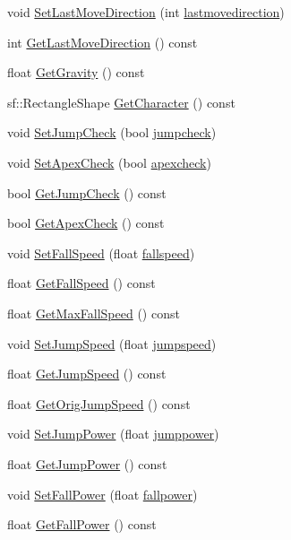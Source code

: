 \begin{DoxyCompactItemize}
\item 
void \hyperlink{classPrincessObject_a7eccf4c5d354c1b48bf19eb3f6c2ef42}{Set\+Last\+Move\+Direction} (int \hyperlink{classPrincessObject_a5a645f3d8269497c59944775e6758e7f}{lastmovedirection})
\item 
int \hyperlink{classPrincessObject_a442d231ddd5d083b1571d276f24318fc}{Get\+Last\+Move\+Direction} () const 
\item 
float \hyperlink{classPrincessObject_a341bb1d246698092d1dd2138dc0a0a9e}{Get\+Gravity} () const 
\item 
sf\+::\+Rectangle\+Shape \hyperlink{classPrincessObject_afd8eaba45b96e8deafd7f2730e2bbb72}{Get\+Character} () const 
\item 
void \hyperlink{classPrincessObject_ac563d582ecc3fdf646c9e0c2af1936fb}{Set\+Jump\+Check} (bool \hyperlink{classPrincessObject_a70b6fd942174a1bb7315cd2d1ff0f214}{jumpcheck})
\item 
void \hyperlink{classPrincessObject_a269f54cc9474075c1af91546f00f7779}{Set\+Apex\+Check} (bool \hyperlink{classPrincessObject_ab7e762d0cd4f1a128b4bb0f53426b587}{apexcheck})
\item 
bool \hyperlink{classPrincessObject_aaf0b5e607b8c0303e667498809214b1d}{Get\+Jump\+Check} () const 
\item 
bool \hyperlink{classPrincessObject_ab05769e290142eed0d4d122bab7ea2e6}{Get\+Apex\+Check} () const 
\item 
void \hyperlink{classPrincessObject_abd96d1e4fed044c8e1a0f99c6b4820d4}{Set\+Fall\+Speed} (float \hyperlink{classPrincessObject_a4a7eba961aedd50e46a53cb02aa87f9b}{fallspeed})
\item 
float \hyperlink{classPrincessObject_aba411af16e874c2c738e101cf11f9e0c}{Get\+Fall\+Speed} () const 
\item 
float \hyperlink{classPrincessObject_a64acccc1494d3f5ed3050d1c1e07c169}{Get\+Max\+Fall\+Speed} () const 
\item 
void \hyperlink{classPrincessObject_ab2428d105c01f96ac469e9718e72aa6b}{Set\+Jump\+Speed} (float \hyperlink{classPrincessObject_a45e94368012495c43c75afc84f699e36}{jumpspeed})
\item 
float \hyperlink{classPrincessObject_adec75a737450940ffc174e16350b17b6}{Get\+Jump\+Speed} () const 
\item 
float \hyperlink{classPrincessObject_a6ca072804db87b265dd00b2ad3805578}{Get\+Orig\+Jump\+Speed} () const 
\item 
void \hyperlink{classPrincessObject_ac871ba390dfea64aa5d9cf5470bc92c6}{Set\+Jump\+Power} (float \hyperlink{classPrincessObject_a5998e01a878a2a26e87ef67e09dddea7}{jumppower})
\item 
float \hyperlink{classPrincessObject_ac66d11faaffaa464f795c2f664ba343a}{Get\+Jump\+Power} () const 
\item 
void \hyperlink{classPrincessObject_ac5510f97c0600235ef7d5789c10d40c8}{Set\+Fall\+Power} (float \hyperlink{classPrincessObject_ad9fbc5d3480baafefa0db06d2e38c423}{fallpower})
\item 
float \hyperlink{classPrincessObject_a05416932be4e45a50400526bc75ff229}{Get\+Fall\+Power} () const 
\end{DoxyCompactItemize}
